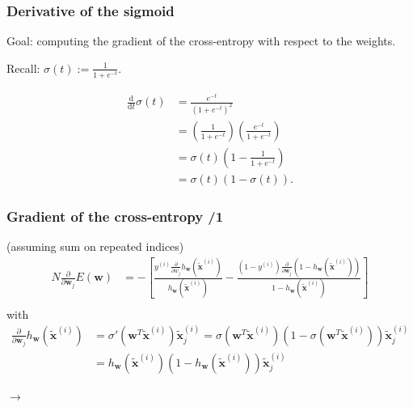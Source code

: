 \documentclass{beamer}
\begin{document}
	\begin{frame}
		\frametitle{Derivative of the sigmoid}
		Goal: computing the gradient of the cross-entropy with respect to the weights.
		
		\vspace{5mm}
		
		Recall: $\sigma(t) := \frac{1}{1+e^{-t}}$.
		
		\begin{align*}
			\frac{\textrm{d}}{\textrm{d}t} \sigma(t) &= \frac{e^{-t}}{(1 + e^{-t})^2}\\
			&= \left(\frac{1}{1 + e^{-t}}\right)\left(\frac{e^{-t}}{1 + e^{-t}}\right)\\
			&= \sigma(t)\left(1 - \frac{1}{1 + e^{-t}}\right)\\
			&= \sigma(t)(1 - \sigma(t)).
		\end{align*}
		
	\end{frame}

	\begin{frame}
		\frametitle{Gradient of the cross-entropy /1}
	
		(assuming sum on repeated indices)
		\begin{align*}
			N\frac{\partial}{\partial \bm{w}_j} E(\bm{w}) &= - \left[\frac{y^{(i)} \frac{\partial}{\partial w_j}h_{\bm{w}}(\tilde{\bm{x}}^{(i)})}{h_{\bm{w}}(\tilde{\bm{x}}^{(i)})} - \frac{(1-y^{(i)}) \frac{\partial}{\partial \bm{w}_j}(1 -h_{\bm{w}}(\tilde{\bm{x}}^{(i)}))}{1-h_{\bm{w}}(\tilde{\bm{x}}^{(i)})}\right]\\
		\end{align*}
		with
		\begin{align*}
			\frac{\partial}{\partial \bm{w}_j} h_{\bm{w}}(\tilde{\bm{x}}^{(i)}) &= \sigma'(\bm{w}^T \tilde{\bm{x}}^{(i)}) \tilde{\bm{x}}^{(i)}_j = \sigma(\bm{w}^T\tilde{\bm{x}}^{(i)})(1 - \sigma(\bm{w}^T \tilde{\bm{x}}^{(i)}))\tilde{\bm{x}}^{(i)}_j\\
			&= h_{\bm{w}}(\tilde{\bm{x}}^{(i)})(1 - h_{\bm{w}}(\tilde{\bm{x}}^{(i)}))\tilde{\bm{x}}^{(i)}_j 
		\end{align*}
	
	\mbox{}\hfill $\rightarrow$
	
	\end{frame}
\end{document}
